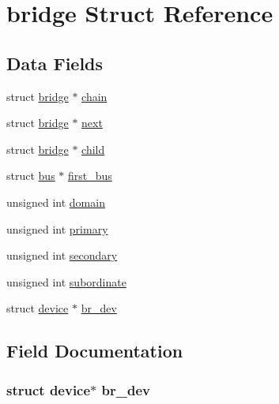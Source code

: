 \hypertarget{structbridge}{}\section{bridge Struct Reference}
\label{structbridge}
\subsection*{Data Fields}
\begin{DoxyCompactItemize}
\item 
struct \hyperlink{structbridge}{bridge} $\ast$ \hyperlink{structbridge_a5950b682ca54ddbc793858fb7649e795}{chain}
\item 
struct \hyperlink{structbridge}{bridge} $\ast$ \hyperlink{structbridge_a5bcd694ffc05406675f47ecfefdec7fc}{next}
\item 
struct \hyperlink{structbridge}{bridge} $\ast$ \hyperlink{structbridge_a0a3f093e3e92edb98532f7c524c9e783}{child}
\item 
struct \hyperlink{structbus}{bus} $\ast$ \hyperlink{structbridge_a8ef9b0d2648e6ed4b69e88ffc7182d8d}{first\+\_\+bus}
\item 
unsigned int \hyperlink{structbridge_a96ef643a7d21b1e41ee9a10872687a29}{domain}
\item 
unsigned int \hyperlink{structbridge_a381d5fcba6918986484fee2448ebaaaa}{primary}
\item 
unsigned int \hyperlink{structbridge_a83e36dceeb07e456cb5820978d2bbc90}{secondary}
\item 
unsigned int \hyperlink{structbridge_ac2065cb9090fedd39708055ac52f8dba}{subordinate}
\item 
struct \hyperlink{structdevice}{device} $\ast$ \hyperlink{structbridge_a551467ff8c50ef88827d710670039a1d}{br\+\_\+dev}
\end{DoxyCompactItemize}


\subsection{Field Documentation}
\subsubsection[{\texorpdfstring{br\+\_\+dev}{br_dev}}]{\setlength{\rightskip}{0pt plus 5cm}struct {\bf device}$\ast$ br\+\_\+dev}\hypertarget{structbridge_a551467ff8c50ef88827d710670039a1d}{}\label{structbridge_a551467ff8c50ef88827d710670039a1d}
